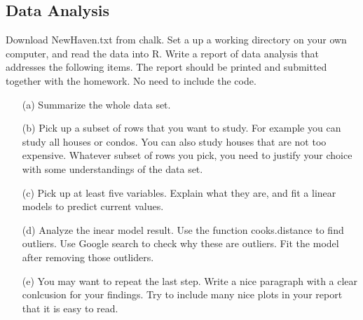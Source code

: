 \documentclass{tufte-book}
\begin{document}
\subsection{Data Analysis} Download NewHaven.txt from chalk.  Set a up a working directory on your own computer, and read the data into R.  Write a report of data analysis that addresses the following items.  The report should be printed and submitted together with the homework.  No need to include the code.

\begin{enumerate}

\item[(a)] Summarize the whole data set.

\item[(b)] Pick up a subset of rows that you want to study.  For example you can study all houses or condos.  You can also study houses that are not too expensive.  Whatever subset of rows you pick, you need to justify your choice with some understandings of the data set.

\item[(c)] Pick up at least five variables.  Explain what they are, and fit a linear models to predict current values.

\item[(d)] Analyze the inear model result.  Use the function cooks.distance to find outliers.  Use Google search to check why these are outliers. Fit the model after removing those outliders.

\item[(e)] You may want to repeat the last step.   Write a nice paragraph with a clear conlcusion for your findings.  Try to include many nice plots in your report that it is easy to read.

\end{enumerate}
\end{document}
